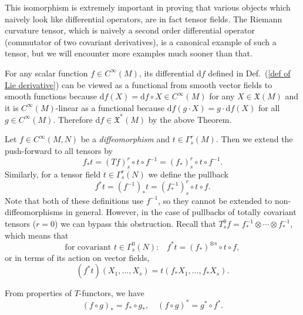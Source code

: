 \documentclass[english,letterpaper]{article}%
\numberwithin{equation}{section}
\numberwithin{figure}{section}
\numberwithin{table}{section}
\theoremstyle{definition}
\theoremstyle{definition}
\theoremstyle{definition}
\theoremstyle{plain}
\theoremstyle{plain}
\theoremstyle{plain}
\theoremstyle{plain}
\theoremstyle{remark}
\theoremstyle{remark}
\def\red{\color{red}}
\newcommand{\dd}{{\mathrm{d}}}
\newcommand{\fX}{\mathfrak{X}}
\newcommand{\PRLsep}{   %
           \noindent\makebox[\linewidth]{
                \resizebox{0.5\linewidth}{1pt}{$\blacklozenge$}}}
\begin{document}
\begin{rem}
    This isomorphism is extremely important in proving that various objects which naively look like differential operators, are in fact tensor fields. The Riemann curvature tensor, which is naively a second order differential operator (commutator of two covariant derivatives), is a canonical example of such a tensor, but we will encounter more examples much sooner than that.
\end{rem}


\begin{example}[$\dd f$ is a one-form]\label{df is a one-form}
    For any scalar function $f\in C^\infty(M)$, its differential $\dd f$ defined in Def.\ (\ref{def of Lie derivative}) can be viewed as a functional from smooth vector fields to smooth functions because $\dd f(X)=\dd f\circ X\in C^\infty(M)$ for any $X\in\fX(M)$ and it is $C^\infty(M)$-linear as a functional because $\dd f(g\cdot X)=g\cdot \dd f(X)$ for all $g\in C^\infty(M)$. Therefore $\dd f\in \fX^\ast(M)$ by the above Theorem.
\end{example}

\begin{defn}
    Let $f\in C^\infty(M,N)$ be a \emph{diffeomorphism} and $t\in \Gamma^r_s(M)$. Then we extend the push-forward to all tensors by
    \[
    f_\ast t=(Tf)^r_s\circ t\circ f^{-1}=(f_\ast)^r_s\circ t\circ f^{-1}.
    \]
    Similarly, for a tensor field $t\in \Gamma^r_s(N)$ we define the pullback
    \[
    f^\ast t=\left(f^{-1}\right)_\ast t=\left(f^{-1}_\ast\right)^r_s\circ t\circ f.
    \]
    Note that both of these definitions use $f^{-1}$, so they cannot be extended to non-diffeomorphisms in general. However, in the case of pullbacks of totally covariant tensors ($r=0$) we can bypass this obstruction. Recall that $T^0_s f=f_\ast^{-1}\otimes\cdots\otimes f_\ast^{-1}$, which means that
    \[
    \text{for covariant $t\in \Gamma^0_s(N)$:}\quad f^\ast t= (f_\ast)^{\otimes s}\circ t\circ f,
    \]
    or in terms of its action on vector fields,
    \[
    (f^\ast t)(X_1,\ldots,X_s)=t(f_\ast X_1,\ldots,f_\ast X_s).
    \]
\end{defn}

\begin{rem}
    From properties of $T$-functors, we have 
    \[
    (f\circ g)_\ast=f_\ast\circ g_\ast,\quad (f\circ g)^\ast=g^\ast\circ f^\ast.
    \]
\end{rem}

\end{document}
